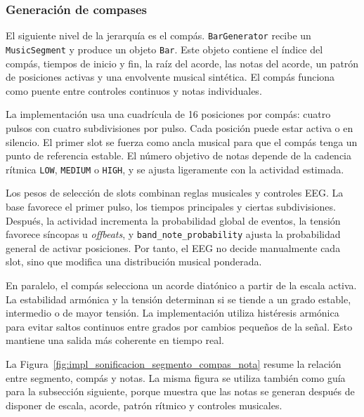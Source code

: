 \subsubsection{Generación de compases}

El siguiente nivel de la jerarquía es el compás. \texttt{BarGenerator} recibe un \texttt{MusicSegment} y produce un objeto \texttt{Bar}. Este objeto contiene el índice del compás, tiempos de inicio y fin, la raíz del acorde, las notas del acorde, un patrón de posiciones activas y una envolvente musical sintética. El compás funciona como puente entre controles continuos y notas individuales.

La implementación usa una cuadrícula de 16 posiciones por compás: cuatro pulsos con cuatro subdivisiones por pulso. Cada posición puede estar activa o en silencio. El primer slot se fuerza como ancla musical para que el compás tenga un punto de referencia estable. El número objetivo de notas depende de la cadencia rítmica \texttt{LOW}, \texttt{MEDIUM} o \texttt{HIGH}, y se ajusta ligeramente con la actividad estimada.

Los pesos de selección de slots combinan reglas musicales y controles EEG. La base favorece el primer pulso, los tiempos principales y ciertas subdivisiones. Después, la actividad incrementa la probabilidad global de eventos, la tensión favorece síncopas u \textit{offbeats}, y \texttt{band\_note\_probability} ajusta la probabilidad general de activar posiciones. Por tanto, el EEG no decide manualmente cada slot, sino que modifica una distribución musical ponderada.

En paralelo, el compás selecciona un acorde diatónico a partir de la escala activa. La estabilidad armónica y la tensión determinan si se tiende a un grado estable, intermedio o de mayor tensión. La implementación utiliza histéresis armónica para evitar saltos continuos entre grados por cambios pequeños de la señal. Esto mantiene una salida más coherente en tiempo real.

La Figura~\ref{fig:impl_sonificacion_segmento_compas_nota} resume la relación entre segmento, compás y notas. La misma figura se utiliza también como guía para la subsección siguiente, porque muestra que las notas se generan después de disponer de escala, acorde, patrón rítmico y controles musicales.

